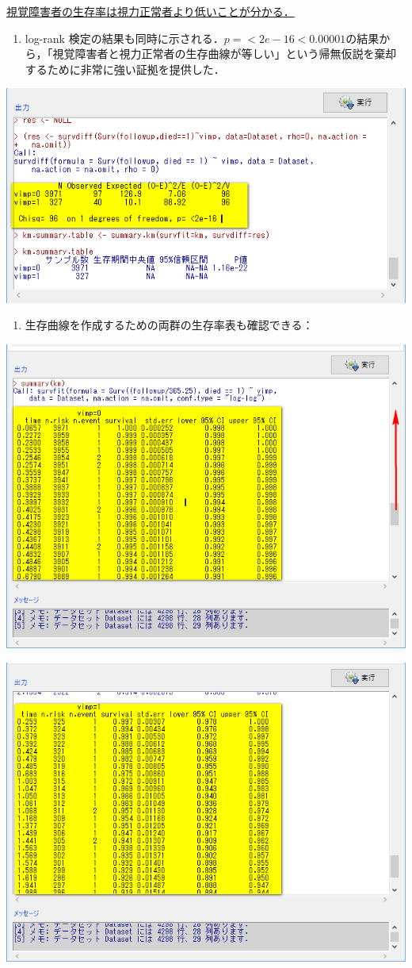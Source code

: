\documentclass[]{problemset}
\providecommand{\tightlist}{%
  \setlength{\itemsep}{0pt}\setlength{\parskip}{0pt}}
\begin{document}
\underline{視覚障害者の生存率は視力正常者より低いことが分かる．}

\begin{enumerate}
\def\labelenumi{\arabic{enumi}.}
\setcounter{enumi}{3}
\tightlist
\item
  log-rank
  検定の結果も同時に示される．\(p = <2e-16 < 0.00001\)の結果から，「視覚障害者と視力正常者の生存曲線が等しい」という帰無仮説を棄却するために非常に強い証拠を提供した．
\end{enumerate}

\begin{center}\includegraphics[width=0.6\linewidth,height=0.4\textheight]{pic/survival10} \end{center}

\newpage

\begin{enumerate}
\def\labelenumi{\arabic{enumi}.}
\setcounter{enumi}{4}
\tightlist
\item
  生存曲線を作成するための両群の生存率表も確認できる：
\end{enumerate}

\begin{center}\includegraphics[width=0.6\linewidth,height=0.4\textheight]{pic/survival11} \end{center}

\begin{center}\includegraphics[width=0.6\linewidth,height=0.4\textheight]{pic/survival12} \end{center}
\end{document}
